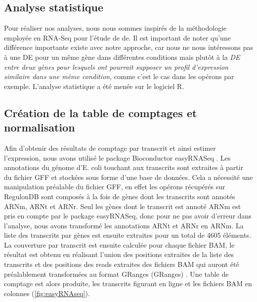 \documentclass[12pt,a4paper]{report}
\begin{document}
\begin{onehalfspace}
\section*{Analyse statistique}
Pour réaliser nos analyses, nous nous sommes inspirés de la méthodologie employée en RNA-Seq pour l'étude de \gls{de}. Il est important de noter qu'une différence importante existe avec notre approche, car nous ne nous intéressons pas à une DE pour un m\^eme gène dans différentes conditions mais plut\^ot à la \emph{DE entre deux gènes pour lesquels ont pourrait supposer un profil d'expression similaire dans une même condition}, comme c'est le cas dans les opérons par exemple.
L'analyse statistique a été menée sur le logiciel R.

\subsection*{Création de la table de comptages et normalisation}
Afin d'obtenir des résultats de comptage par transcrit et ainsi estimer l'expression, nous avons utilisé le package Bioconductor easyRNASeq \citep{Delhomme2012}. Les annotations du génome d'E. coli touchant aux transcrits sont extraites à partir du fichier GFF et stockées sous forme d'une base de données. Cela a nécessité une manipulation préalable du fichier GFF, en effet les opérons récupérés sur RegulonDB sont composés à la fois de gènes dont les transcrits sont annotés ARNm, ARNt et ARNr. Seul les gènes dont le transcrit est annoté ARNm est pris en compte par le package easyRNASeq, donc pour ne pas avoir d'erreur dans l'analyse, nous avons transformé les annotations ARNt et ARNr en ARNm.
La liste des transcrits par gènes est ensuite extraites pour un total de 4605 éléments. La couverture par transcrit est ensuite calculée pour chaque fichier BAM, le résultat est obtenu en réalisant l'union des positions extraites de la liste des transcrits et des positions des reads extraites des fichiers BAM qui auront été préalablement transformées au format \gls{GRanges} (GRanges)  \citep{Lawrence2013}. Une table de comptage est alors produite, les transcrits figurant en ligne et les fichiers BAM en colonnes (\autoref{fig:easyRNAseq}).


\end{onehalfspace}
\end{document}
